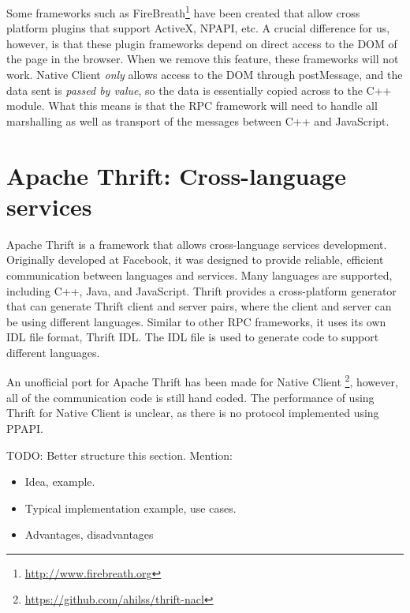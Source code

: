 Some frameworks such as FireBreath\footnote{\url{http://www.firebreath.org}} have been created that allow cross platform plugins that support ActiveX, NPAPI, etc. A crucial difference for us, however, is that these plugin frameworks depend on direct access to the DOM of the page in the browser. When we remove this feature, these frameworks will not work. Native Client \emph{only} allows access to the DOM through postMessage, and the data sent is \emph{passed by value}, so the data is essentially copied across to the C++ module. What this means is that the RPC framework will need to handle all marshalling as well as transport of the messages between C++ and JavaScript.




\section{Apache Thrift: Cross-language services} %
\label{sec:apache_thrift_cross_language_services}
Apache Thrift is a framework that allows cross-language services development. Originally developed at Facebook, it was designed to provide reliable, efficient communication between languages and services. Many languages are supported, including C++, Java, and JavaScript. Thrift provides a cross-platform generator that can generate Thrift client and server pairs, where the client and server can be using different languages. Similar to other RPC frameworks, it uses its own IDL file format, Thrift IDL. The IDL file is used to generate code to support different languages.

An unofficial port for Apache Thrift has been made for Native Client \footnote{\url{https://github.com/ahilss/thrift-nacl}}, however, all of the communication code is still hand coded. The performance of using Thrift for Native Client is unclear, as there is no protocol implemented using PPAPI.

TODO: Better structure this section. Mention:
\begin{itemize}
	\item Idea, example.
	\item Typical implementation example, use cases.
	\item Advantages, disadvantages
\end{itemize}



